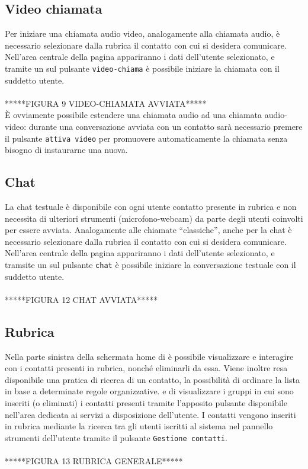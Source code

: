 \subsection{Video chiamata}
Per iniziare una chiamata audio video, analogamente alla chiamata audio, è necessario selezionare dalla rubrica il contatto con cui si desidera comunicare. Nell'area centrale della pagina appariranno i dati dell'utente selezionato, e tramite un  sul pulsante 
\texttt{video-chiama} è possibile iniziare la chiamata con il suddetto utente.
\\\\*****FIGURA 9 VIDEO-CHIAMATA AVVIATA*****
\\È ovviamente possibile estendere una chiamata audio ad una chiamata audio-video: durante una conversazione avviata con un contatto sarà necessario premere il pulsante \texttt{attiva video} per promuovere automaticamente la chiamata senza bisogno di instaurarne una nuova.
\subsection{Chat}
La chat testuale è disponibile con ogni utente contatto presente in rubrica e non necessita di ulteriori strumenti (microfono-webcam) da parte degli utenti coinvolti per essere avviata. Analogamente alle chiamate ``classiche'', anche per la chat è necessario selezionare dalla rubrica il contatto con cui si desidera comunicare. Nell'area centrale della pagina appariranno i dati dell'utente selezionato, e tramsite un  sul pulsante \texttt{chat} è possibile iniziare la conversazione testuale con il suddetto utente.
\\\\*****FIGURA 12 CHAT AVVIATA*****
\subsection{Rubrica}
Nella parte sinistra della schermata home di \caName{} è possibile visualizzare e interagire con i contatti presenti in rubrica, nonché eliminarli da essa. 
Viene inoltre resa disponibile una pratica  di ricerca di un contatto, la possibilità di ordinare la lista in base a determinate regole organizzative. e di visualizzare i gruppi in cui sono inseriti (o eliminati) i contatti presenti tramite l'apposito pulsante disponibile nell'area dedicata ai servizi a disposizione dell'utente.
I contatti vengono inseriti in rubrica mediante la ricerca tra gli utenti iscritti al sistema nel pannello strumenti dell'utente tramite il pulsante \texttt{Gestione contatti}.
\\\\*****FIGURA 13 RUBRICA GENERALE*****
